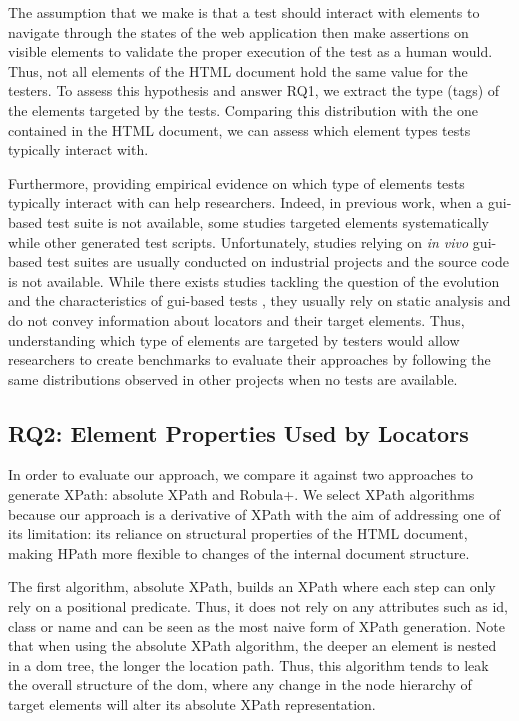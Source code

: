 The assumption that we make is that a test should interact with elements to navigate through the states of the web application then make assertions on visible elements to validate the proper execution of the test as a human would. Thus, not all elements of the HTML document hold the same value for the testers. To assess this hypothesis and answer RQ1, we extract the type (tags) of the elements targeted by the tests. Comparing this distribution with the one contained in the HTML document, we can assess which element types tests typically interact with. 

Furthermore, providing empirical evidence on which type of elements tests typically interact with can help researchers. Indeed, in previous work, when a \gls{gui}-based test suite is not available, some studies targeted elements systematically\cite{Cohen2015, Leotta2015, Aldalur2017, Eladawy2018} while other generated test scripts\cite{Grechanik2009, Montoto2011, Kirinuki2019}. Unfortunately, studies relying on \emph{in vivo} \gls{gui}-based test suites are usually conducted on industrial projects and the source code is not available\cite{Thummalapenta2013, Yandrapally2014}. While there exists studies tackling the question of the evolution and the characteristics of \gls{gui}-based tests \cite{Christophe2014, Rwemalika2019}, they usually rely on static analysis and do not convey information about locators and their target elements. Thus, understanding which type of elements are targeted by testers would allow researchers to create benchmarks to evaluate their approaches by following the same distributions observed in other projects when no tests are available.

\subsection{RQ2: Element Properties Used by Locators}
\label{sec:hpath-protocol-rq2}

In order to evaluate our approach, we compare it against two approaches to generate XPath: absolute XPath and Robula+. We select XPath algorithms because our approach is a derivative of XPath with the aim of addressing one of its limitation: its reliance on structural properties of the HTML document, making HPath more flexible to changes of the internal document structure.

The first algorithm, absolute XPath, builds an XPath where each step can only rely on a positional predicate. Thus, it does not rely on any attributes such as id, class or name and can be seen as the most naive form of XPath generation. Note that when using the absolute XPath algorithm, the deeper an element is nested in a \gls{dom} tree, the longer the location path. Thus, this algorithm tends to leak the overall structure of the \gls{dom}, where any change in the node hierarchy of target elements will alter its absolute XPath representation.

